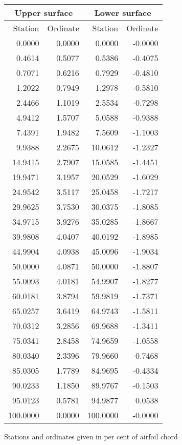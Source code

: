 \documentclass[11pt]{book}
\begin{document}
 \hspace{4mm}
 \begin{tabular}{|r|r|r|r|} \hline 
 \multicolumn{2}{|c|}{Upper surface} & \multicolumn{2}{|c|}{Lower surface} \\
 \hline
 Station & Ordinate & Station & Ordinate \\
 \hline
0.0000 & 0.0000 & 0.0000 & -0.0000 \\
0.4614 & 0.5077 & 0.5386 & -0.4075 \\
0.7071 & 0.6216 & 0.7929 & -0.4810 \\
1.2022 & 0.7949 & 1.2978 & -0.5810 \\
2.4466 & 1.1019 & 2.5534 & -0.7298 \\
4.9412 & 1.5707 & 5.0588 & -0.9388 \\
7.4391 & 1.9482 & 7.5609 & -1.1003 \\
9.9388 & 2.2675 & 10.0612 & -1.2327 \\
14.9415 & 2.7907 & 15.0585 & -1.4451 \\
19.9471 & 3.1957 & 20.0529 & -1.6029 \\
24.9542 & 3.5117 & 25.0458 & -1.7217 \\
29.9625 & 3.7530 & 30.0375 & -1.8085 \\
34.9715 & 3.9276 & 35.0285 & -1.8667 \\
39.9808 & 4.0407 & 40.0192 & -1.8985 \\
44.9904 & 4.0938 & 45.0096 & -1.9034 \\
50.0000 & 4.0871 & 50.0000 & -1.8807 \\
55.0093 & 4.0181 & 54.9907 & -1.8277 \\
60.0181 & 3.8794 & 59.9819 & -1.7371 \\
65.0257 & 3.6419 & 64.9743 & -1.5811 \\
70.0312 & 3.2856 & 69.9688 & -1.3411 \\
75.0341 & 2.8458 & 74.9659 & -1.0558 \\
80.0340 & 2.3396 & 79.9660 & -0.7468 \\
85.0305 & 1.7789 & 84.9695 & -0.4334 \\
90.0233 & 1.1850 & 89.9767 & -0.1503 \\
95.0123 & 0.5781 & 94.9877 & 0.0538 \\
100.0000 & 0.0000 & 100.0000 & -0.0000 \\
 \hline 
 \end{tabular}
 \vspace{8mm}

Stations and ordinates given in per cent of airfoil chord
\end{document}

